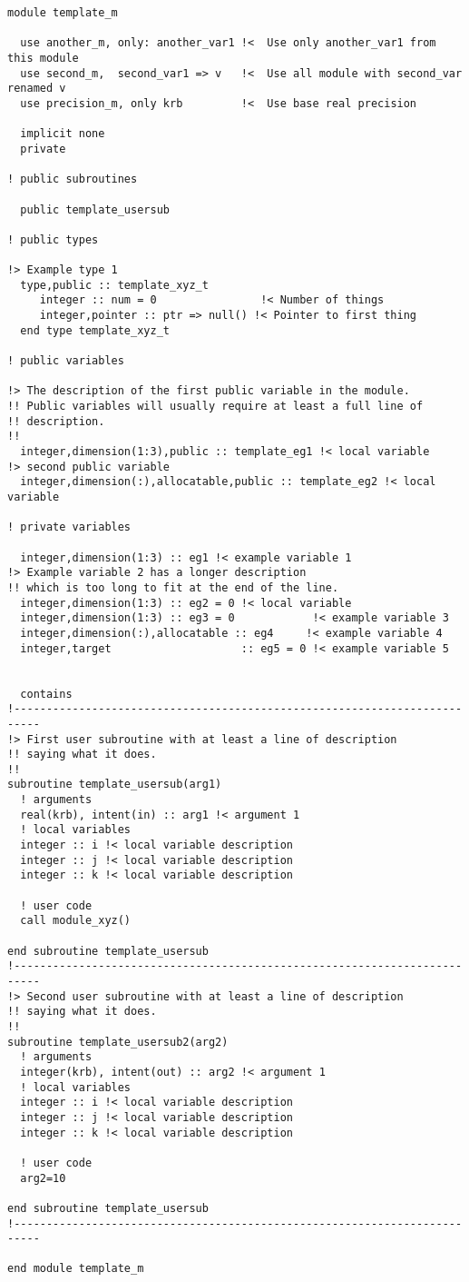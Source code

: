 \small
\begin{verbatim}
module template_m

  use another_m, only: another_var1 !<  Use only another_var1 from this module
  use second_m,  second_var1 => v   !<  Use all module with second_var renamed v
  use precision_m, only krb         !<  Use base real precision

  implicit none
  private

! public subroutines

  public template_usersub

! public types

!> Example type 1
  type,public :: template_xyz_t
     integer :: num = 0                !< Number of things
     integer,pointer :: ptr => null() !< Pointer to first thing
  end type template_xyz_t

! public variables

!> The description of the first public variable in the module.
!! Public variables will usually require at least a full line of
!! description.
!!
  integer,dimension(1:3),public :: template_eg1 !< local variable
!> second public variable
  integer,dimension(:),allocatable,public :: template_eg2 !< local variable

! private variables

  integer,dimension(1:3) :: eg1 !< example variable 1
!> Example variable 2 has a longer description
!! which is too long to fit at the end of the line.
  integer,dimension(1:3) :: eg2 = 0 !< local variable
  integer,dimension(1:3) :: eg3 = 0            !< example variable 3
  integer,dimension(:),allocatable :: eg4     !< example variable 4
  integer,target                    :: eg5 = 0 !< example variable 5


  contains
!--------------------------------------------------------------------------
!> First user subroutine with at least a line of description
!! saying what it does.
!!
subroutine template_usersub(arg1)
  ! arguments
  real(krb), intent(in) :: arg1 !< argument 1
  ! local variables
  integer :: i !< local variable description
  integer :: j !< local variable description
  integer :: k !< local variable description

  ! user code
  call module_xyz()

end subroutine template_usersub
!--------------------------------------------------------------------------
!> Second user subroutine with at least a line of description
!! saying what it does.
!!
subroutine template_usersub2(arg2)
  ! arguments
  integer(krb), intent(out) :: arg2 !< argument 1
  ! local variables
  integer :: i !< local variable description
  integer :: j !< local variable description
  integer :: k !< local variable description

  ! user code
  arg2=10

end subroutine template_usersub
!--------------------------------------------------------------------------

end module template_m
\end{verbatim}
\normalsize
